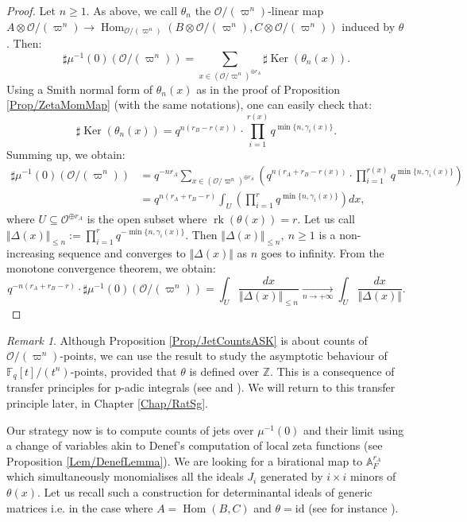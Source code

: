 \documentclass[11pt,english]{article}
\numberwithin{equation}{section}
\numberwithin{figure}{section}
\theoremstyle{definition}
\theoremstyle{plain}
\theoremstyle{remark}
\newtheorem{rmk}[df]{Remark}
\DeclareMathOperator{\Ker}{Ker}
\DeclareMathOperator{\Hom}{Hom}
\DeclareMathOperator{\rk}{rk}
\newcommand\ZZ{\mathbb{Z}}
\newcommand\FF{\mathbb{F}}
\begin{document}
\begin{proof}

Let $n\geq1$. As above, we call $\theta_{n}$ the $\mathcal{O}/(\varpi^{n})$-linear
map $A\otimes\mathcal{O}/(\varpi^{n})\rightarrow\Hom_{\mathcal{O}/(\varpi^{n})}(B\otimes\mathcal{O}/(\varpi^{n}),C\otimes\mathcal{O}/(\varpi^{n}))$
induced by $\theta$. Then:\[
\sharp\mu^{-1}(0)(\mathcal{O}/(\varpi^n))=\sum_{x\in (\mathcal{O}/\varpi^n)^{\oplus r_A}}\sharp\Ker(\theta_n(x)).
\]Using a Smith normal form of $\theta_{n}(x)$ as in the proof of Proposition
\ref{Prop/ZetaMomMap} (with the same notations), one can easily check
that:\[
\sharp\Ker(\theta_n(x))=q^{n(r_B-r(x))}\cdot\prod_{i=1}^{r(x)}q^{\min\{n,\gamma_i(x)\}}.
\]Summing up, we obtain:\[
\begin{split}
\sharp\mu^{-1}(0)(\mathcal{O}/(\varpi^n))
& =
q^{-nr_A}\sum_{x\in (\mathcal{O}/\varpi^n)^{\oplus r_A}}\left( q^{n(r_A+r_B-r(x))}\cdot\prod_{i=1}^{r(x)}q^{\min\{n,\gamma_i(x)\}}\right) \\
& =
q^{n(r_A+r_B-r)}\int_{U}\left(\prod_{i=1}^{r}q^{\min\{n,\gamma_i(x)\}}\right) dx,
\end{split}
\]where $U\subseteq\mathcal{O}^{\oplus r_{A}}$ is the open subset where
$\rk(\theta(x))=r$. Let us call $\Vert\Delta(x)\Vert_{\leq n}:=\prod_{i=1}^{r}q^{-\min\{n,\gamma_{i}(x)\}}$.
Then $\Vert\Delta(x)\Vert_{\leq n},\ n\geq1$ is a non-increasing
sequence and converges to $\Vert\Delta(x)\Vert$ as $n$ goes to infinity.
From the monotone convergence theorem, we obtain:\[
q^{-n(r_A+r_B-r)}\cdot\sharp\mu^{-1}(0)(\mathcal{O}/(\varpi^n))=\int_U\frac{dx}{\Vert\Delta(x)\Vert_{\leq n}}\underset{n\rightarrow +\infty}{\longrightarrow}\int_U\frac{dx}{\Vert\Delta(x)\Vert}.
\]

\end{proof}

\begin{rmk}

Although Proposition \ref{Prop/JetCountsASK} is about counts of $\mathcal{O}/(\varpi^{n})$-points,
we can use the result to study the asymptotic behaviour of $\FF_{q}[t]/(t^{n})$-points,
provided that $\theta$ is defined over $\ZZ$. This is a consequence
of transfer principles for p-adic integrals (see \cite{CL05,CL10}
and \cite[Prop. 3.0.2.]{AA18}). We will return to this transfer principle
later, in Chapter \ref{Chap/RatSg}.

\end{rmk}

Our strategy now is to compute counts of jets over $\mu^{-1}(0)$
and their limit using a change of variables akin to Denef's computation
of local zeta functions (see Proposition \ref{Lem/DenefLemma}). We
are looking for a birational map to $\mathbb{A}_{F}^{r_{A}}$ which
simultaneously monomialises all the ideals $J_{i}$ generated by $i\times i$
minors of $\theta(x)$. Let us recall such a construction for determinantal
ideals of generic matrices i.e. in the case where $A=\Hom(B,C)$ and
$\theta=\mathrm{id}$ (see for instance \cite{Vai84}).
\end{document}
